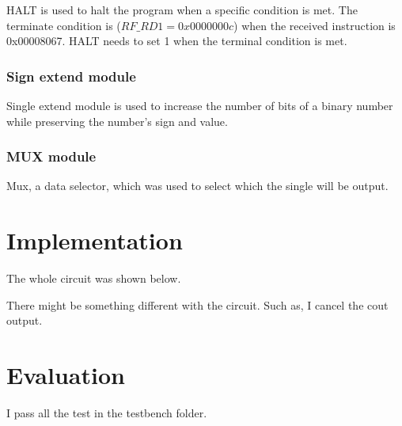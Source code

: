 \documentclass[12pt,a4paper]{article}
\begin{document}
HALT is used to halt the program when a specific condition is met.
The terminate condition is ($RF\_ RD1 = 0x0000000c$) when the received instruction is 0x00008067. 
HALT needs to set 1 when the terminal condition is met.

\subsubsection{Sign extend module}

Single extend module is used to increase the number of bits of a binary number while preserving the number's sign and value. 

\subsubsection{MUX module}

Mux, a data selector, which was used to select which the single will be output.

\newpage

\section{Implementation}

The whole circuit was shown below.


There might be something different with the circuit.
Such as, I cancel the cout output.
\newpage

\section{Evaluation}

I pass all the test in the testbench folder.



\end{document}
